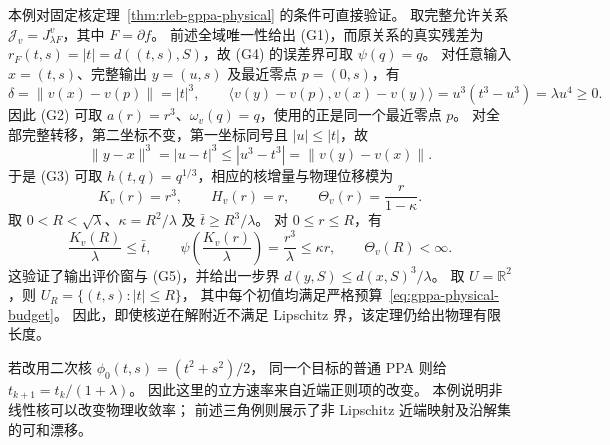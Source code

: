 本例对固定核定理~\ref{thm:rleb-gppa-physical} 的条件可直接验证。
取完整允许关系 $\mathcal J_v=J^v_{\lambda F}$，其中 $F=\partial f$。
前述全域唯一性给出 (G1)，而原关系的真实残差为
$r_F(t,s)=|t|=d((t,s),S)$，故 (G4) 的误差界可取 $\psi(q)=q$。
对任意输入 $x=(t,s)$、完整输出 $y=(u,s)$ 及最近零点 $p=(0,s)$，有
\[
 \delta=\|v(x)-v(p)\|=|t|^3,
 \qquad
 \langle v(y)-v(p),v(x)-v(y)\rangle
 =u^3(t^3-u^3)=\lambda u^4\ge0.
\]
因此 (G2) 可取 $a(r)=r^3$、$\omega_v(q)=q$，使用的正是同一个最近零点 $p$。
对全部完整转移，第二坐标不变，第一坐标同号且 $|u|\le|t|$，故
\[
 \|y-x\|^3=|u-t|^3
 \le|u^3-t^3|=\|v(y)-v(x)\|.
\]
于是 (G3) 可取 $h(t,q)=q^{1/3}$，相应的核增量与物理位移模为
\[
 K_v(r)=r^3,\qquad H_v(r)=r,\qquad
 \Theta_v(r)=\frac{r}{1-\kappa}.
\]
取 $0<R<\sqrt\lambda$、$\kappa=R^2/\lambda$ 及 $\bar t\ge R^3/\lambda$。
对 $0\le r\le R$，有
\[
 \frac{K_v(R)}\lambda\le\bar t,\qquad
 \psi\!\left(\frac{K_v(r)}\lambda\right)
 =\frac{r^3}\lambda\le\kappa r,
 \qquad \Theta_v(R)<\infty.
\]
这验证了输出评价窗与 (G5)，并给出一步界 $d(y,S)\le d(x,S)^3/\lambda$。
取 $U=\mathbb R^2$，则 $U_R=\{(t,s):|t|\le R\}$，
其中每个初值均满足严格预算~\eqref{eq:gppa-physical-budget}。
因此，即使核逆在解附近不满足 Lipschitz 界，该定理仍给出物理有限长度。

若改用二次核 $\phi_0(t,s)=(t^2+s^2)/2$，
同一个目标的普通 PPA 则给 $t_{k+1}=t_k/(1+\lambda)$。
因此这里的立方速率来自近端正则项的改变。
本例说明非线性核可以改变物理收敛率；
前述三角例则展示了非 Lipschitz 近端映射及沿解集的可和漂移。
